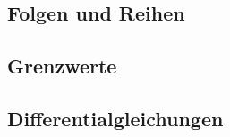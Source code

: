 \documentclass[../zusammenfassung_AN.tex]{subfiles}
\begin{document}
	
	\subsection{Folgen und Reihen}
	
	
	\subsection{Grenzwerte}
	
	
	\subsection{Differentialgleichungen}
	
	
\end{document}
